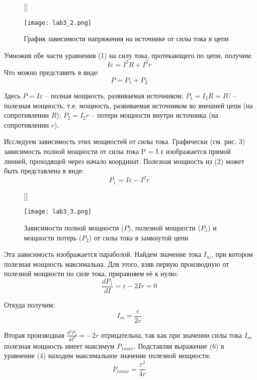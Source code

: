 \documentclass[12pt, a4paper]{article}
\begin{document}
\begin{figure}[H]
[\FBwidth]
{\caption{График зависимости напряжения на источнике от силы тока в цепи}}
{\texttt{[image: lab3\_2.png]}}
\end{figure}

\noindent Умножив обе части уравнения (1) на силу тока, протекающего по цепи, получим:
\begin{equation}
I\varepsilon = I^2R + I^2r
\end{equation}
Что можно представить в виде:
\begin{equation}
P = P_1 + P_2
\end{equation}

Здесь $P = I\varepsilon$ – полная мощность, развиваемая источником; $P_1 = I_2R = IU$ –
полезная мощность, т.е. мощность, развиваемая источником во внешней цепи
(на сопротивлении $R$); $P_2 = I_2r$ – потери мощности внутри источника (на
сопротивлении $r$).

Исследуем зависимость этих мощностей от силы тока. Графически (см.
рис. 3) зависимость полной мощности от силы тока P = I ε изображается
прямой линией, проходящей через начало координат. Полезная мощность из (2)
может быть представлена в виде:
\begin{equation}
P_1 = I\varepsilon − I^2r
\end{equation}

\begin{figure}[H]
[\FBwidth]
{\caption{Зависимости полной мощности ($P$), полезной мощности ($P_1$) и мощности потерь ($P_2$)
от силы тока в замкнутой цепи}}
{\texttt{[image: lab3\_3.png]}}
\end{figure}

Эта зависимость изображается параболой. Найдем значение тока $I_m$, при
котором полезная мощность максимальна. Для этого, взяв первую производную
от полезной мощности по силе тока, приравняем её к нулю:
\begin{equation}
\frac{dP_1}{dI} = \varepsilon - 2Ir = 0
\end{equation}

Откуда получим:
\begin{equation}
I_m = \frac{\varepsilon}{2r}
\end{equation}

Вторая производная $\frac{d^2P_1}{dI^2} = -2r$ отрицательна, так как при значении силы
тока $I_m$ полезная мощность имеет максимум $P_{1max}$. Подставляя выражение (6) в
уравнение (4) находим максимальное значение полезной мощности:
\begin{equation}
P_{1max} = \frac{\varepsilon^2}{4r}
\end{equation}
\end{document}
